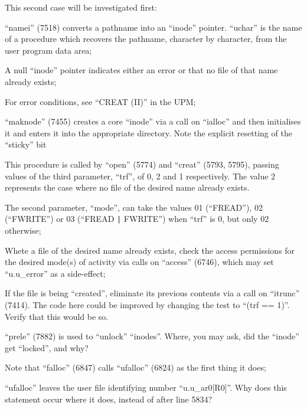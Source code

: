This second case will be investigated
first:



\bd
\item[5786:] ``namei'' (7518) converts a pathname into an ``inode'' pointer.
 ``uchar'' is the name of a procedure which recovers the pathname, character by character,
 from the user program data area;

\item[5787:] A null ``inode'' pointer indicates
 either an error or that no file
 of that name already exists;

\item[5788:] For error conditions, see ``CREAT
 (II)'' in the UPM;

\item[5790:] ``maknode'' (7455) creates a core
 ``inode'' via a call on ``ialloc''
 and then initialises it and
 enters it into the appropriate
 directory. Note the explicit
 resetting of the ``sticky'' bit
\ed



This procedure is called by ``open''
(5774) and ``creat'' (5793, 5795), passing values of the third parameter,
``trf'', of 0, 2 and 1 respectively. The
value 2 represents the case where no
file of the desired name already
exists.

\bd
\item[5812:] The second parameter, ``mode'', can
 take the values 01 (``FREAD''), 02
(``FWRITE'') or 03 (``FREAD \verb+|+ FWRITE'')
when ``trf'' is 0, but only 02 otherwise;

Whete a file of the desired name
already exists, check the access
permissions for the desired
mode(s) of activity via calls on
``access'' (6746), which may set
``u.u\_error'' as a side-effect;

\item[5824:] If the file is being ``created'',
 eliminate its previous contents
 via a call on ``itrunc'' (7414).
 The code here could be improved
 by changing the test to ``(trf ==
 1)''. Verify that this would be
 so.

\item[5826:] ``prele'' (7882) is used to
 ``unlock'' ``inodes''. Where, you
 may ask, did the ``inode'' get
 ``locked'', and why?

\item[5827:] Note that ``falloc'' (6847) calls
 ``ufalloc'' (6824) as the first
 thing it does;

\item[5831:] ``ufalloc'' leaves
 the user file
identifying number
``u.u\_ar0[R0]''. Why does this
statement occur where it does,
instead of after line 5834?

